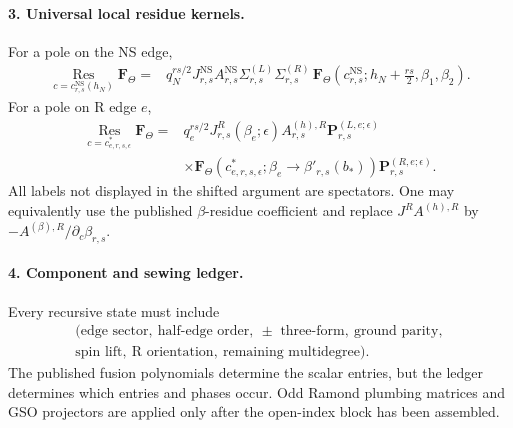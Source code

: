 \documentclass[11pt]{article}
\newcommand{\NS}{\mathrm{NS}}
\newcommand{\Res}{\operatorname*{Res}}
\begin{document}
\paragraph{3. Universal local residue kernels.}
For a pole on the NS edge,
\begin{equation}
 \begin{aligned}
 \Res_{c=c^{\NS}_{r,s}(h_N)}\mathbf F_\Theta
 ={}&
 q_N^{rs/2}
 J^{\NS}_{r,s}A^{\NS}_{r,s}
 \Sigma^{(L)}_{r,s}\Sigma^{(R)}_{r,s}\,
 \mathbf F_\Theta
 \left(c^{\NS}_{r,s};
 h_N+\frac{rs}{2},\beta_1,\beta_2\right).
 \end{aligned}
 \label{eq:nrr-complete-ns-residue}
\end{equation}
For a pole on R edge \(e\),
\begin{equation}
 \begin{aligned}
 \Res_{c=c^*_{e,r,s,\epsilon}}\mathbf F_\Theta
 ={}&
 q_e^{rs/2}
 J^{R}_{r,s}(\beta_e;\epsilon)A^{(h),R}_{r,s}
 \mathbf P^{(L,e;\epsilon)}_{r,s}
 \\
 &\times
 \mathbf F_\Theta
 \left(c^*_{e,r,s,\epsilon};
 \beta_e\longrightarrow\beta'_{r,s}(b_*)\right)
 \mathbf P^{(R,e;\epsilon)}_{r,s}.
 \end{aligned}
 \label{eq:nrr-complete-r-residue}
\end{equation}
All labels not displayed in the shifted argument are spectators.  One may
equivalently use the published \(\beta\)-residue coefficient and replace
\(J^R A^{(h),R}\) by
\(-A^{(\beta),R}/\partial_c\beta_{r,s}\).

\paragraph{4. Component and sewing ledger.}
Every recursive state must include
\begin{equation}
\begin{gathered}
 (\text{edge sector},\ \text{half-edge order},\ \pm\text{ three-form},
 \ \text{ground parity},\\
 \text{spin lift},\ \text{R orientation},\
 \text{remaining multidegree}).
\end{gathered}
 \label{eq:nrr-recursion-state}
\end{equation}
The published fusion polynomials determine the scalar entries, but the
ledger determines which entries and phases occur.  Odd Ramond plumbing
matrices and GSO projectors are applied only after the open-index block has
been assembled.
\end{document}
